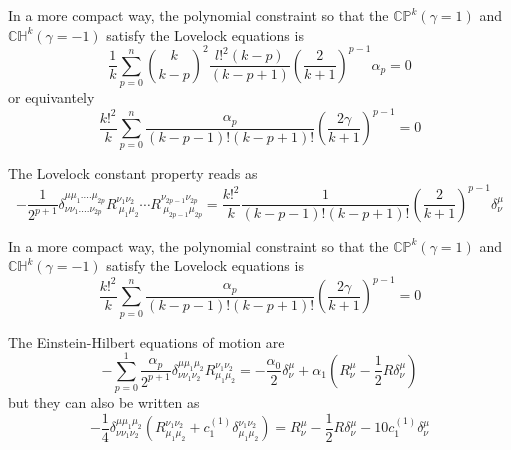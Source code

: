 \begin{tcolorbox}
In a more compact way, the polynomial constraint so that the $\mathbb{CP}^k (\gamma=1)$ and $\mathbb{CH}^k (\gamma=-1)$ satisfy the Lovelock equations is
\begin{equation*}
    \frac{1}{k}\sum_{p=0}^n\binom{k}{k-p}^2\frac{l!^2(k-p)}{(k-p+1)}\left(\frac{2}{k+1}\right)^{p-1}\alpha_p=0
\end{equation*}
or equivantely
\begin{equation*}
    \frac{k!^2}{k}\sum_{p=0}^n\frac{\alpha_p}{(k-p-1)!(k-p+1)!}\left(\frac{2\gamma}{k+1}\right)^{p-1}=0
\end{equation*}
\end{tcolorbox}

The Lovelock constant property reads as
\begin{equation*}
    -\frac{1}{2^{p+1}}\delta^{\mu\mu_1....\mu_{2p}}_{\nu\nu_1....\nu_{2p}}R^{\nu_1\nu_2}_{\ \mu_1\mu_2}\cdots R^{\nu_{2p-1}\nu_{2p}}_{\ \mu_{2p-1}\mu_{2p}}=\frac{k!^2}{k}\frac{1}{(k-p-1)!(k-p+1)!}\left(\frac{2}{k+1}\right)^{p-1}\delta^\mu_\nu
\end{equation*}

\begin{tcolorbox}
In a more compact way, the polynomial constraint so that the $\mathbb{CP}^k (\gamma=1)$ and $\mathbb{CH}^k (\gamma=-1)$ satisfy the Lovelock equations is
\begin{equation*}
    \frac{k!^2}{k}\sum_{p=0}^n\frac{\alpha_p}{(k-p-1)!(k-p+1)!}\left(\frac{2\gamma}{k+1}\right)^{p-1}=0
\end{equation*}
\end{tcolorbox}

\newpage
The Einstein-Hilbert equations of motion are
\begin{equation*}
    -\sum_{p=0}^1\frac{\alpha_p}{2^{p+1}}\delta^{\mu\mu_1\mu_2}_{\nu\nu_1\nu_2}R^{\nu_1\nu_2}_{\mu_1\mu_2}=-\frac{\alpha_0}{2}\delta^\mu_\nu+\alpha_1\left(R^\mu_\nu-\frac{1}{2}R\delta^\mu_\nu\right)
\end{equation*}
but they can also be written as
\begin{equation*}
    -\frac{1}{4}\delta^{\mu\mu_1\mu_2}_{\nu\nu_1\nu_2}\left(R^{\nu_1\nu_2}_{\mu_1\mu_2}+c_1^{(1)}\delta^{\nu_1\nu_2}_{\mu_1\mu_2}\right)=R^\mu_\nu-\frac{1}{2}R\delta^\mu_\nu-10c_1^{(1)}\delta^\mu_\nu
\end{equation*}
